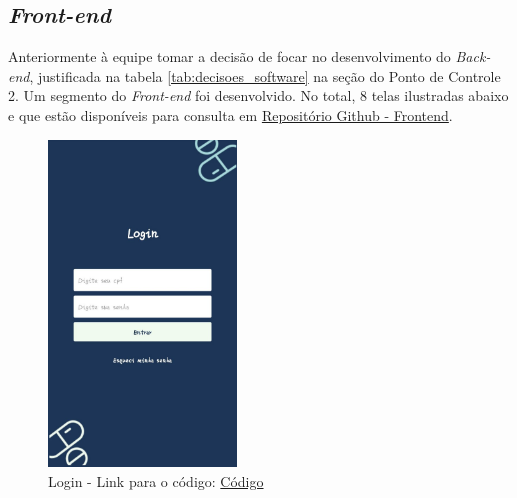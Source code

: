 \begin{apendicesenv}
\section{\textit{Front-end}}

Anteriormente à equipe tomar a decisão de focar no desenvolvimento do \textit{Back-end}, justificada na tabela \ref{tab:decisoes_software} na seção do Ponto de Controle 2. Um segmento do \textit{Front-end} foi desenvolvido. No total, 8 telas ilustradas abaixo e que estão disponíveis para consulta em \href{https://github.com/PillWatcher/pillwatcher-dpf-service/tree/dev/components}{Repositório Github - Frontend}.



\begin{figure}[H]
    \centering
    \includegraphics[width=5cm]{figuras/Software_Telas_Frontend/front_login.jpg}
    \caption{Login - Link para o código: \href{https://github.com/PillWatcher/pillwatcher-dpf-service/blob/dev/components/login.js}{Código}}
    \label{fig:login}
\end{figure}


\end{apendicesenv}
